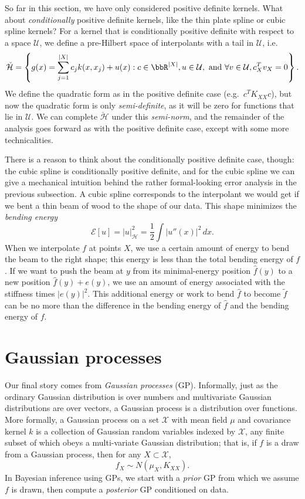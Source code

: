 \documentclass[12pt, leqno]{article} %
\begin{document}
So far in this section, we have only considered positive definite
kernels.  What about {\em conditionally} positive definite kernels,
like the thin plate spline or cubic spline kernels?  For a kernel that
is conditionally positive definite with respect to a space
$\mathcal{U}$, we define a pre-Hilbert space of interpolants with
a tail in $\mathcal{U}$, i.e.
\[
  \check{\mathcal{H}} =
  \left\{ g(x) = \sum_{j=1}^{|X|} c_j k(x,x_j) + u(x) :
    c \in \bbR^{|X|}, u \in \mathcal{U},
    \mbox{ and } \forall v \in \mathcal{U}, c_X^T v_X = 0 \right\}.
\]
We define the quadratic form as in the positive definite case
(e.g.~$c^T K_{XX} c$), but now the quadratic form is only
{\em semi-definite}, as it will be zero for functions that
lie in $\mathcal{U}$.  We can complete $\check{\mathcal{H}}$
under this {\em semi-norm}, and the remainder of the analysis
goes forward as with the positive definite case, except with some more
technicalities.

There is a reason to think about the conditionally positive definite
case, though: the cubic spline is conditionally positive definite,
and for the cubic spline we can give a mechanical intuition behind the
rather formal-looking error analysis in the previous subsection.
A cubic spline corresponds to the interpolant we would get if we bent a thin
beam of wood to the shape of our data.  This shape minimizes the
{\em bending energy}
\[
  \mathcal{E}[u] = |u|_{\mathcal{H}}^2 = \frac{1}{2} \int |u''(x)|^2 \, dx.
\]
When we interpolate $f$ at points $X$, we use a certain amount of
energy to bend the beam to the right shape; this energy is less than
the total bending energy of $f$.  If we want to push the beam at $y$
from its minimal-energy position $\hat{f}(y)$ to a new position
$\hat{f}(y) + e(y)$, we use an amount of energy associated with the
stiffness times $|e(y)|^2$.  This additional energy or work to bend
$\hat{f}$ to become $\tilde{f}$ can be no more than the difference in
the bending energy of $\hat{f}$ and the bending energy of $f$.

\section{Gaussian processes}

Our final story comes from {\em Gaussian processes} (GP).  Informally, just
as the ordinary Gaussian distribution is over numbers and multivariate
Gaussian distributions are over vectors, a Gaussian process is a
distribution over functions.  More formally, a Gaussian process on a
set $\mathcal{X}$ with mean field $\mu$ and covariance kernel $k$ is a
collection of Gaussian random variables indexed by $\mathcal{X}$, any
finite subset of which obeys a multi-variate Gaussian distribution;
that is, if $f$ is a draw from a Gaussian process, then for any
$X \subset \mathcal{X}$,
\[
  f_X \sim N(\mu_X, K_{XX}).
\]
In Bayesian inference using GPs, we start with a {\em prior} GP from
which we assume $f$ is drawn, then compute a {\em posterior} GP
conditioned on data.
\end{document}
